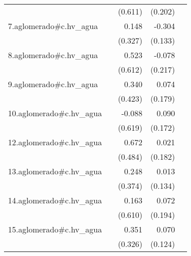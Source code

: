 {\begin{longtable}{l*{4}{D{.}{.}{-1}}}
            &                     &     (0.611)         &     (0.202)         &                     \\
\addlinespace
7.aglomerado#c.hv\_agua&                     &       0.148         &      -0.304\sym{*}  &                     \\
            &                     &     (0.327)         &     (0.133)         &                     \\
\addlinespace
8.aglomerado#c.hv\_agua&                     &       0.523         &      -0.078         &                     \\
            &                     &     (0.612)         &     (0.217)         &                     \\
\addlinespace
9.aglomerado#c.hv\_agua&                     &       0.340         &       0.074         &                     \\
            &                     &     (0.423)         &     (0.179)         &                     \\
\addlinespace
10.aglomerado#c.hv\_agua&                     &      -0.088         &       0.090         &                     \\
            &                     &     (0.619)         &     (0.172)         &                     \\
\addlinespace
12.aglomerado#c.hv\_agua&                     &       0.672         &       0.021         &                     \\
            &                     &     (0.484)         &     (0.182)         &                     \\
\addlinespace
13.aglomerado#c.hv\_agua&                     &       0.248         &       0.013         &                     \\
            &                     &     (0.374)         &     (0.134)         &                     \\
\addlinespace
14.aglomerado#c.hv\_agua&                     &       0.163         &       0.072         &                     \\
            &                     &     (0.610)         &     (0.194)         &                     \\
\addlinespace
15.aglomerado#c.hv\_agua&                     &       0.351         &       0.070         &                     \\
            &                     &     (0.326)         &     (0.124)         &                     \\

\end{longtable}}
